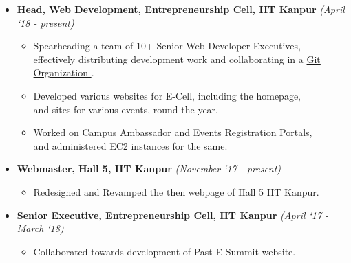 
{\fontsize{11pt}{1em}\bodyfontlight\upshape\color{text}
	\begin{itemize}
		\item \textbf{Head, Web Development, Entrepreneurship Cell, IIT Kanpur}	
			\hfill \textit{(April ‘18 - present)}
			\begin{itemize}
				\item Spearheading a team of 10+ Senior Web Developer Executives,
					\\
					effectively distributing development work and collaborating in a
					\href{https://github.com/ECell-IITK/}{Git Organization \ExternalLink}.
				\item Developed various websites for E-Cell, including the homepage,
					\\
					and sites for various events, round-the-year.
				\item Worked on Campus Ambassador and Events Registration Portals,
					\\
					and administered EC2 instances for the same.
			\end{itemize}

		\item \textbf{Webmaster, Hall 5, IIT Kanpur}
			\hfill \textit{(November ‘17 - present)}
			\begin{itemize}
				\item Redesigned and Revamped the then webpage of Hall 5 IIT Kanpur. 
			\end{itemize}

		\item \textbf{Senior Executive, Entrepreneurship Cell, IIT Kanpur}
			\hfill \textit{(April ‘17 - March ‘18)}
			\begin{itemize}
				\item Collaborated towards development of Past E-Summit website.
			\end{itemize}
	\end{itemize}
}
